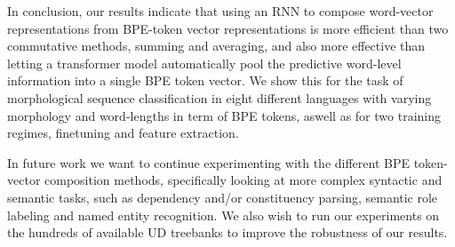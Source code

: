 \documentclass[11pt]{article}
\begin{document}
                In conclusion, our results indicate that using an RNN
     to compose word-vector representations from BPE-token vector representations is more efficient
     than two commutative methods, summing and averaging, and also
     more effective than letting a transformer model automatically pool the
     predictive word-level information into a single BPE token vector.
    We show this for the task of morphological sequence classification in 
     eight different languages with varying morphology and word-lengths in term of BPE
     tokens, aswell as for two training regimes, finetuning and
     feature extraction.

     
    In future work we want to continue experimenting with the different
    BPE token-vector composition methods, specifically looking at more complex
    syntactic and semantic tasks, such as dependency and/or
    constituency parsing, semantic role labeling and named entity recognition. 
        We also wish to run our experiments on the hundreds
     of available UD treebanks to improve the robustness of our
     results.
    

	
	
	
\end{document}
